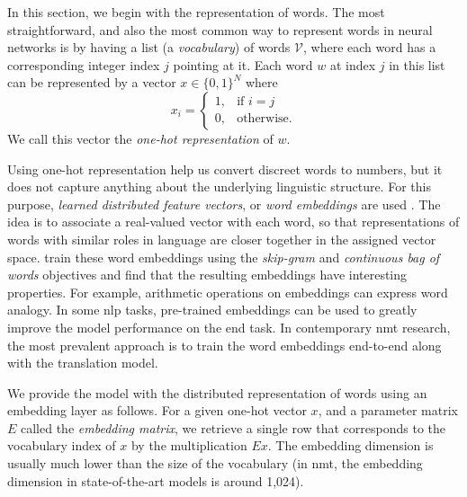 In this section, we begin with the representation of words. The most
straightforward, and also the most common way to represent words in neural
networks is by having a list (a \emph{vocabulary}) of words $\mathcal{V}$, where each
word has a corresponding integer index $j$ pointing at it. Each word $w$ at
index $j$ in this list can be represented by a vector
$x \in \{0,1\}^N$ where
%
\begin{equation} x_i =
\begin{cases} 1, & \text{if } i = j \\ 0, & \text{otherwise.}
\end{cases}
\end{equation}
%
We call this vector the \emph{one-hot representation} of $w$.

Using one-hot representation help us convert discreet words to numbers, but it
does not capture anything about the underlying linguistic structure.  For this
purpose, \emph{learned distributed feature vectors}, or \emph{word embeddings}
are used \citep{bengio2003neural} . The idea is to
associate a real-valued vector with each word, so that representations of words
with similar roles in language are closer together in the assigned vector
space. \citet{mikolov2013distributed} train these word embeddings using the
\emph{skip-gram} and \emph{continuous bag of words} objectives and find that
the resulting embeddings have interesting properties. For example, arithmetic
operations on embeddings can express word analogy.  In some \gls{nlp} tasks,
pre-trained embeddings can be used to greatly improve the model performance on
the end task. In contemporary \gls{nmt} research, the most prevalent approach
is to train the word embeddings end-to-end along with the translation model.

We provide the model with the distributed representation of words using an
embedding layer as follows. For a given one-hot vector $x$, and a
parameter matrix $E$ called the \emph{embedding matrix}, we retrieve a single
row that corresponds to the vocabulary index of $x$ by the
multiplication $E x$.
The embedding dimension is usually much lower than the size of the vocabulary
(in \gls{nmt}, the embedding dimension in state-of-the-art models is around
1,024).

